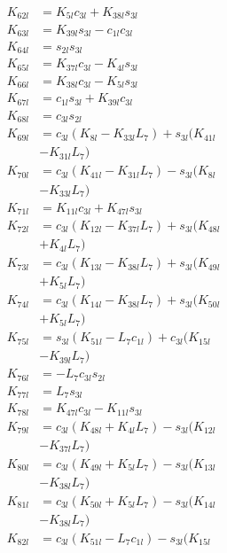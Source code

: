 \begin{multicols}{2}
\begin{align}
K_{62l} &= K_{5l}c_{3l} + K_{38l}s_{3l} \nonumber \\
K_{63l} &= K_{39l}s_{3l} - c_{1l}c_{3l} \nonumber \\
K_{64l} &= s_{2l}s_{3l} \nonumber \\
K_{65l} &= K_{37l}c_{3l} - K_{4l}s_{3l} \nonumber \\
K_{66l} &= K_{38l}c_{3l} - K_{5l}s_{3l} \nonumber \\
K_{67l} &= c_{1l}s_{3l} + K_{39l}c_{3l} \nonumber \\
K_{68l} &= c_{3l}s_{2l} \nonumber \\
K_{69l} &= c_{3l}(K_{8l} - K_{33l}L_7) + s_{3l}(K_{41l}  \nonumber \\
&- K_{31l}L_7) \nonumber \\
K_{70l} &= c_{3l}(K_{41l} - K_{31l}L_7) - s_{3l}(K_{8l}  \nonumber \\
&- K_{33l}L_7) \nonumber \\
K_{71l} &= K_{11l}c_{3l} + K_{47l}s_{3l} \nonumber \\
K_{72l} &= c_{3l}(K_{12l} - K_{37l}L_7) + s_{3l}(K_{48l}  \nonumber \\
&+ K_{4l}L_7) \nonumber \\
K_{73l} &= c_{3l}(K_{13l} - K_{38l}L_7) + s_{3l}(K_{49l}  \nonumber \\
&+ K_{5l}L_7) \nonumber \\
K_{74l} &= c_{3l}(K_{14l} - K_{38l}L_7) + s_{3l}(K_{50l}  \nonumber \\
&+ K_{5l}L_7) \nonumber \\
K_{75l} &= s_{3l}(K_{51l} - L_7c_{1l}) + c_{3l}(K_{15l}  \nonumber \\
&- K_{39l}L_7) \nonumber \\
K_{76l} &= -L_7c_{3l}s_{2l} \nonumber \\
K_{77l} &= L_7s_{3l} \nonumber \\
K_{78l} &= K_{47l}c_{3l} - K_{11l}s_{3l} \nonumber \\
K_{79l} &= c_{3l}(K_{48l} + K_{4l}L_7) - s_{3l}(K_{12l}  \nonumber \\
&- K_{37l}L_7) \nonumber \\
K_{80l} &= c_{3l}(K_{49l} + K_{5l}L_7) - s_{3l}(K_{13l}  \nonumber \\
&- K_{38l}L_7) \nonumber \\
K_{81l} &= c_{3l}(K_{50l} + K_{5l}L_7) - s_{3l}(K_{14l}  \nonumber \\
&- K_{38l}L_7) \nonumber \\
K_{82l} &= c_{3l}(K_{51l} - L_7c_{1l}) - s_{3l}(K_{15l}  \nonumber \\

\end{align}
\end{multicols}
